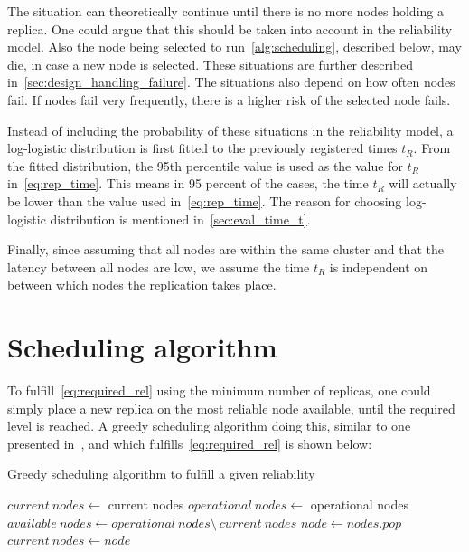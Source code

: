 \documentclass{cslthse-msc}
\begin{document}
The situation can theoretically continue until there is no more nodes holding a replica. One could argue that this should be taken into account in the reliability model. Also the node being selected to run~\cref{alg:scheduling}, described below, may die, in case a new node is selected. These situations are further described in~\cref{sec:design_handling_failure}. The situations also depend on how often nodes fail. If nodes fail very frequently, there is a higher risk of the selected node fails.

Instead of including the probability of these situations in the reliability model, a log-logistic distribution is first fitted to the previously registered times $t_R$. From the fitted distribution, the 95th percentile value is used as the value for $t_R$ in~\cref{eq:rep_time}. This means in 95 percent of the cases, the time $t_R$ will actually be lower than the value used in~\cref{eq:rep_time}. The reason for choosing log-logistic distribution is mentioned in~\cref{sec:eval_time_t}.

Finally, since assuming that all nodes are within the same cluster and that the latency between all nodes are low, we assume the time $t_R$ is independent on between which nodes the replication takes place. 

\section{Scheduling algorithm} \label{sec:design_sched_alg}
To fulfill~\cref{eq:required_rel} using the minimum number of replicas, one could simply place a new replica on the most reliable node available, until the required level is reached. A greedy scheduling algorithm doing this, similar to one presented in~\cite{effTaskReplMobGrid}, and which fulfills~\cref{eq:required_rel} is shown below:


\begin{algorithm}[H]
	\caption{Greedy scheduling algorithm to fulfill a given reliability} \label{alg:scheduling}
	\begin{algorithmic}[1]
	\Statex
	\State $current\ nodes\gets$ current nodes
	\State $operational\ nodes\gets $ operational nodes
	\State $available\ nodes\gets operational\ nodes \setminus \ current\ nodes$
	\State
		\State $node\gets nodes.pop$
		\State
		\State $current\ nodes\gets node$
	\EndWhile
	\EndProcedure
	\end{algorithmic}
\end{algorithm} 
\end{document}
